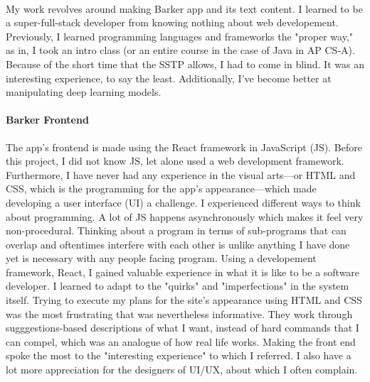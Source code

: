 \documentclass[12pt, letterpaper]{article}
\begin{document}
\paragraph{}My work revolves around making Barker app and its text content. I learned to be a super-full-stack developer from knowing nothing about web developement. Previously, I learned programming languages and frameworks the "proper way," as in, I took an intro class (or an entire course in the case of Java in AP CS-A). Because of the short time that the SSTP allows, I had to come in blind. It was an interesting experience, to say the least. Additionally, I've become better at manipulating deep learning models. 

\paragraph{Barker Frontend}The app's frontend is made using the React framework in JavaScript (JS). Before this project, I did not know JS, let alone used a web development framework. Furthermore, I have never had any experience in the visual arts---or HTML and CSS, which is the programming for the app's appearance---which made developing a user interface (UI) a challenge. I experienced different ways to think about programming. A lot of JS happens asynchronously which makes it feel very non-procedural. Thinking about a program in terms of sub-programs that can overlap and oftentimes interfere with each other is unlike anything I have done yet is necessary with any people facing program. Using a developement framework, React, I gained valuable experience in what it is like to be a software developer. I learned to adapt to the "quirks" and "imperfections" in the system itself. Trying to execute my plans for the site's appearance using HTML and CSS was the most frustrating that was nevertheless informative. They work through sugggestions-based descriptions of what I want, instead of hard commands that I can compel, which was an analogue of how real life works. Making the front end spoke the most to the "interesting experience" to which I referred. I also have a lot more appreciation for the designers of UI/UX, about which I often complain.
\end{document}
